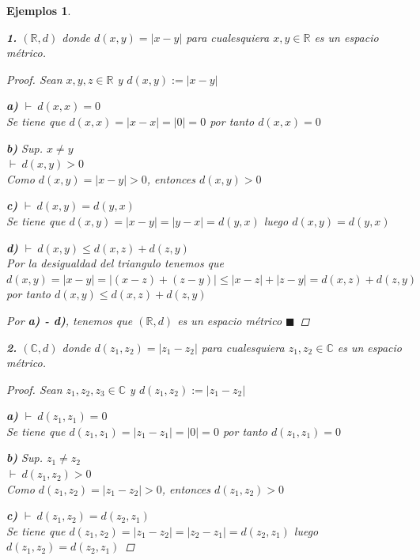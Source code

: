 \documentclass[oneside]{book} %
\theoremstyle{Teorema}
\theoremstyle{Ejemplos}
\newtheorem{Ejemplos}[Definicion]{Ejemplos}
\theoremstyle{[Obs]}
\newcommand{\abs}[1]{\left|#1\right|} %
\renewcommand{\{}{\left\lbrace} %
\renewcommand{\}}{\right\rbrace} %
\newcommand{\R}{\mathbb{R}} %
\newcommand{\C}{\mathbb{C}} %
\renewcommand{\qed}{$\blacksquare$} %
\newcommand{\pd}{$\vdash\ $} %
\begin{document}
			\begin{Ejemplos}\label{Ejemplos: Metricas basicas}\setlength{\parindent}{0em}

				\textbf{1.} $(\R, d)$ donde $d(x, y) = \abs{x - y}$ para cualesquiera $x, y \in \R$ es un espacio métrico. 
				
				\begin{proof}
					
					Sean $x, y, z \in \R$ y $d(x, y) := \abs{x - y}$

					\textbf{a)} \pd $d(x, x) = 0$ \\
					Se tiene que $d(x, x) = \abs{x - x} = \abs{0} = 0$ por tanto $d(x, x) = 0$ 

					\textbf{b)} Sup. $x \neq y$ \\
					\pd $d(x, y) > 0$ \\
					Como $d(x, y) = \abs{x - y} > 0$, entonces $d(x, y) > 0$ 

					\textbf{c)} \pd $d(x, y) = d(y, x)$ \\
					Se tiene que $d(x, y) = \abs{x - y} = \abs{y - x} = d(y, x)$ luego $d(x, y) = d(y, x)$ 

					\textbf{d)} \pd $d(x, y) \leq d(x, z) + d(z, y)$ \\
					Por la desigualdad del triangulo tenemos que $d(x, y) = \abs{x - y} = \abs{(x - z) + (z - y)} \leq \abs{x - z} + \abs{z - y} = d(x, z) + d(z, y)$ por tanto $d(x, y) \leq d(x, z) + d(z, y)$ 

					Por \textbf{a) - d)}, tenemos que $(\R, d)$ es un espacio métrico \qed 

				\end{proof}
				
				\textbf{2.} $(\C, d)$ donde $d(z_1, z_2) = \abs{z_1 - z_2}$ para cualesquiera $z_1, z_2 \in \C$ es un espacio métrico. 

				\begin{proof}
					
					Sean $z_1, z_2, z_3 \in \C$ y $d(z_1, z_2) := \abs{z_1 - z_2}$

					\textbf{a)} \pd $d(z_1, z_1) = 0$ \\
					Se tiene que $d(z_1, z_1) = \abs{z_1 - z_1} = \abs{0} = 0$ por tanto $d(z_1, z_1) = 0$ 

					\textbf{b)} Sup. $z_1 \neq z_2$ \\
					\pd $d(z_1, z_2) > 0$ \\
					Como $d(z_1, z_2) = \abs{z_1 - z_2} > 0$, entonces $d(z_1, z_2) > 0$ 

					\textbf{c)} \pd $d(z_1, z_2) = d(z_2, z_1)$ \\
					Se tiene que $d(z_1, z_2) = \abs{z_1 - z_2} = \abs{z_2 - z_1} = d(z_2, z_1)$ luego $d(z_1, z_2) = d(z_2, z_1)$ 


\end{proof}
\end{Ejemplos}
\end{document}
